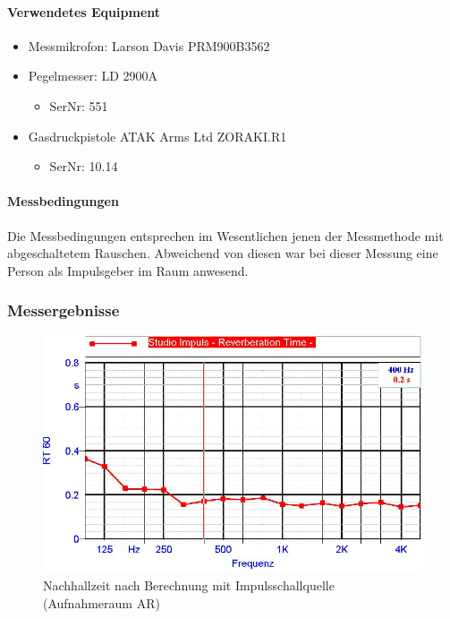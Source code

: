 \documentclass[11pt]{report}
\begin{document}
\paragraph{Verwendetes Equipment}
\begin{itemize}
\item Messmikrofon: Larson Davis PRM900B3562
\item Pegelmesser: LD 2900A
\begin{itemize}
\item SerNr: 551
\end{itemize}
\item Gasdruckpistole ATAK Arms Ltd ZORAKI.R1
\begin{itemize}
\item SerNr: 10.14
\end{itemize}
\end{itemize}
\paragraph{Messbedingungen}
Die Messbedingungen entsprechen im Wesentlichen jenen der Messmethode mit abgeschaltetem Rauschen. Abweichend von diesen war bei dieser Messung eine Person als Impulsgeber im Raum anwesend.
\subsubsection{Messergebnisse}
\begin{figure}[htbp]
\begin{center}
\includegraphics[width=14cm,keepaspectratio=true]{ImpulsMP1}
\caption{Nachhallzeit nach Berechnung mit Impulsschallquelle (Aufnahmeraum AR)}
\label{fig:i2geometrics}
\end{center}
\end{figure}
\end{document}
